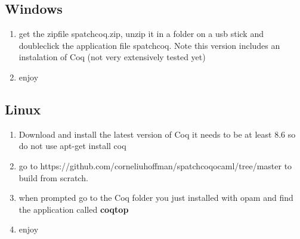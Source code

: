 \subsection{Windows}
\begin{enumerate}

\item get the zipfile spatchcoq.zip,  unzip it in a folder on a usb stick and doubleclick the application file spatchcoq. 
Note this version includes an instalation of Coq (not very extensively tested yet)

\item enjoy
\end{enumerate}


\subsection{Linux}
\begin{enumerate}
\item Download and install  the latest version of Coq it needs to be at least 8.6 so do not use 
apt-get install coq
\item  go to https://github.com/corneliuhoffman/spatchcoqocaml/tree/master
to build from scratch.
\item when prompted go to the Coq folder you just installed with opam and find  the application called {\bf coqtop}

\item enjoy
\end{enumerate}










